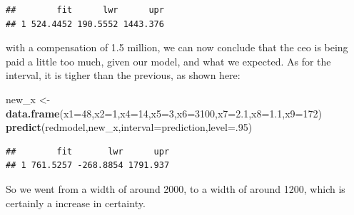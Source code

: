 \documentclass[
]{article}
\newenvironment{Shaded}{\begin{snugshade}}{\end{snugshade}}
\newcommand{\AttributeTok}[1]{\textcolor[rgb]{0.13,0.29,0.53}{#1}}
\newcommand{\DecValTok}[1]{\textcolor[rgb]{0.00,0.00,0.81}{#1}}
\newcommand{\FloatTok}[1]{\textcolor[rgb]{0.00,0.00,0.81}{#1}}
\newcommand{\FunctionTok}[1]{\textcolor[rgb]{0.13,0.29,0.53}{\textbf{#1}}}
\newcommand{\NormalTok}[1]{#1}
\newcommand{\OtherTok}[1]{\textcolor[rgb]{0.56,0.35,0.01}{#1}}
\newcommand{\StringTok}[1]{\textcolor[rgb]{0.31,0.60,0.02}{#1}}
\begin{document}
\begin{verbatim}
##        fit      lwr      upr
## 1 524.4452 190.5552 1443.376
\end{verbatim}

with a compensation of 1.5 million, we can now conclude that the ceo is
being paid a little too much, given our model, and what we expected. As
for the interval, it is tigher than the previous, as shown here:

\begin{Shaded}
\begin{Highlighting}[]
\NormalTok{new\_x }\OtherTok{\textless{}{-}} \FunctionTok{data.frame}\NormalTok{(}\AttributeTok{x1=}\DecValTok{48}\NormalTok{,}\AttributeTok{x2=}\DecValTok{1}\NormalTok{,}\AttributeTok{x4=}\DecValTok{14}\NormalTok{,}\AttributeTok{x5=}\DecValTok{3}\NormalTok{,}\AttributeTok{x6=}\DecValTok{3100}\NormalTok{,}\AttributeTok{x7=}\FloatTok{2.1}\NormalTok{,}\AttributeTok{x8=}\FloatTok{1.1}\NormalTok{,}\AttributeTok{x9=}\DecValTok{172}\NormalTok{)}
\FunctionTok{predict}\NormalTok{(redmodel,new\_x,}\AttributeTok{interval=}\StringTok{\textquotesingle{}prediction\textquotesingle{}}\NormalTok{,}\AttributeTok{level=}\NormalTok{.}\DecValTok{95}\NormalTok{)}
\end{Highlighting}
\end{Shaded}

\begin{verbatim}
##        fit       lwr      upr
## 1 761.5257 -268.8854 1791.937
\end{verbatim}

So we went from a width of around 2000, to a width of around 1200, which
is certainly a increase in certainty.
\end{document}
